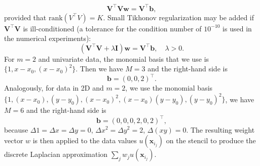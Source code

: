 \documentclass[preprint]{elsarticle}       %
\begin{document}
\[
\mathbf{V}^\top\mathbf{V} \mathbf{w} = \mathbf{V}^\top\mathbf{b}, \]
provided that $\text{rank}(V^\top V)=K$. Small Tikhonov regularization may be added if $\mathbf{V}^\top \mathbf{V}$ is ill-conditioned (a tolerance for the condition number of $10^{-10}$ is used in the numerical experiments):
\[
(\mathbf{V}^\top \mathbf{V} + \lambda \mathbf{I}) \mathbf{w} = \mathbf{V}^\top\mathbf{b},\quad \lambda>0. \]
For $m = 2$ and univariate data, the monomial basis that we use is $\{1, x-x_0, (x-x_0)^2\}$. Then we have $M = 3$ and the right-hand side is
\[
\mathbf{b} = ( 0, 0, 2)^\top.
\]
Analogously, for data in 2D and $m = 2$, we use the monomial basis $\{1, (x-x_0), (y-y_0), (x-x_0)^2, (x-x_0)(y-y_0), (y-y_0)^2\}$, we have $M = 6$ and the right-hand side is
\[
\mathbf{b} = (0, 0, 0, 2, 0, 2)^\top,
\]
because $\Delta 1 = \Delta x = \Delta y = 0$, $\Delta x^2 = \Delta y^2 = 2$, $\Delta(xy) = 0$. The resulting weight vector $w$ is then applied to the data values $u(\mathbf{x}_{i_j})$ on the stencil to produce the discrete Laplacian approximation $\sum_j w_j u(\mathbf{x}_{i_j})$.





\end{document}
